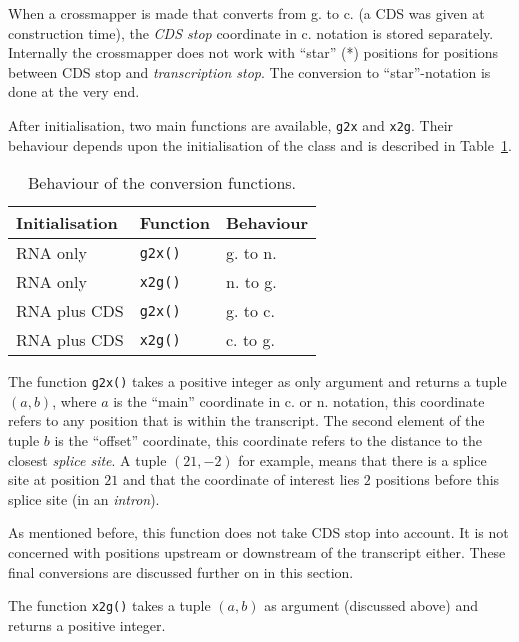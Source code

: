 \documentclass{article}
\begin{document}
When a crossmapper is made that converts from g. to c. (a CDS was given at 
construction time), the \emph{CDS stop} coordinate in c. notation is stored 
separately. Internally the crossmapper does not work with ``star'' (*)
positions for positions between CDS stop and \emph{transcription stop}. The
conversion to ``star''-notation is done at the very end.

After initialisation, two main functions are available, \texttt{g2x} and 
\texttt{x2g}. Their behaviour depends upon the initialisation of the class and
is described in Table~\ref{tab:behaviour}.

\begin{table}[H]
\begin{center}
\begin{tabular}{l|l|l}
Initialisation & Function       & Behaviour \\
\hline
RNA only       & \texttt{g2x()} & g. to n. \\
RNA only       & \texttt{x2g()} & n. to g. \\
RNA plus CDS   & \texttt{g2x()} & g. to c. \\
RNA plus CDS   & \texttt{x2g()} & c. to g.
\end{tabular}
\caption{Behaviour of the conversion functions.} \label{tab:behaviour}
\end{center}
\end{table}


The function \texttt{g2x()} takes a positive integer as only argument and
returns a tuple $(a, b)$, where $a$ is the ``main'' coordinate in c. or n.
notation, this coordinate refers to any position that is within the transcript.
The second element of the tuple $b$ is the ``offset'' coordinate, this
coordinate refers to the distance to the closest \emph{splice site}. A tuple
$(21, -2)$ for example, means that there is a splice site at position $21$ and
that the coordinate of interest lies $2$ positions before this splice site (in
an \emph{intron}). 

As mentioned before, this function does not take CDS stop into account. It is 
not concerned with positions upstream or downstream of the transcript either. 
These final conversions are discussed further on in this section.

The function \texttt{x2g()} takes a tuple $(a, b)$ as argument (discussed
above) and returns a positive integer.
\end{document}
